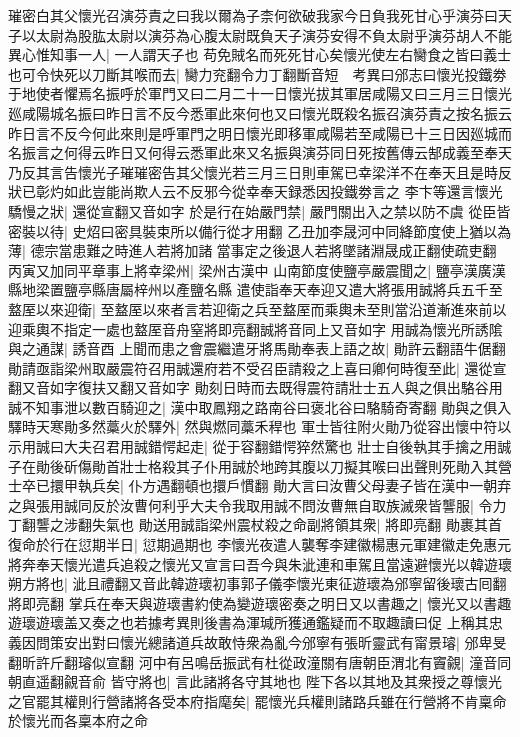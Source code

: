 璀密白其父懷光召演芬責之曰我以爾為子柰何欲破我家今日負我死甘心乎演芬曰天子以太尉為股肱太尉以演芬為心腹太尉既負天子演芬安得不負太尉乎演芬胡人不能異心惟知事一人|{
	一人謂天子也}
苟免賊名而死死甘心矣懷光使左右臠食之皆曰義士也可令快死以刀斷其喉而去|{
	臠力兖翻令力丁翻斷音短　考異曰邠志曰懷光投鐵劵于地使者懼焉名振呼於軍門又曰二月二十一日懷光拔其軍居咸陽又曰三月三日懷光廵咸陽城名振曰昨日言不反今悉軍此來何也又曰懷光既殺名振召演芬責之按名振云昨日言不反今何此來則是呼軍門之明日懷光即移軍咸陽若至咸陽已十三日因廵城而名振言之何得云昨日又何得云悉軍此來又名振與演芬同日死按舊傳云郜成義至奉天乃反其言告懷光子璀璀密告其父懷光若三月三日則車駕已幸梁洋不在奉天且是時反狀已彰灼如此豈能尚欺人云不反邪今從幸奉天録悉因投鐵劵言之}
李卞等還言懷光驕慢之狀|{
	還從宣翻又音如字}
於是行在始嚴門禁|{
	嚴門關出入之禁以防不虞}
從臣皆密裝以待|{
	史炤曰密具裝束所以備行從才用翻}
乙丑加李晟河中同絳節度使上猶以為薄|{
	德宗當患難之時進人若將加諸當事定之後退人若將墜諸淵晟成正翻使疏吏翻}
丙寅又加同平章事上將幸梁州|{
	梁州古漢中}
山南節度使鹽亭嚴震聞之|{
	鹽亭漢廣漢縣地梁置鹽亭縣唐屬梓州以產鹽名縣}
遣使詣奉天奉迎又遣大將張用誠將兵五千至盩厔以來迎衛|{
	至盩厔以來者言若迎衛之兵至盩厔而乘輿未至則當沿道漸進來前以迎乘輿不指定一處也盩厔音舟窒將即亮翻誠將音同上又音如字}
用誠為懷光所誘隂與之通謀|{
	誘音酉}
上聞而患之會震繼遣牙將馬勛奉表上語之故|{
	勛許云翻語牛倨翻}
勛請亟詣梁州取嚴震符召用誠還府若不受召臣請殺之上喜曰卿何時復至此|{
	還從宣翻又音如字復扶又翻又音如字}
勛刻日時而去既得震符請壯士五人與之俱出駱谷用誠不知事泄以數百騎迎之|{
	漢中取鳳翔之路南谷曰褒北谷曰駱騎奇寄翻}
勛與之俱入驛時天寒勛多然藁火於驛外|{
	然與燃同藁禾稈也}
軍士皆往附火勛乃從容出懷中符以示用誠曰大夫召君用誠錯愕起走|{
	從于容翻錯愕猝然驚也}
壯士自後執其手擒之用誠子在勛後斫傷勛首壯士格殺其子仆用誠於地跨其腹以刀擬其喉曰出聲則死勛入其營士卒已擐甲執兵矣|{
	仆方遇翻頓也擐戶慣翻}
勛大言曰汝曹父母妻子皆在漢中一朝弃之與張用誠同反於汝曹何利乎大夫令我取用誠不問汝曹無自取族滅衆皆讋服|{
	令力丁翻讋之涉翻失氣也}
勛送用誠詣梁州震杖殺之命副將領其衆|{
	將即亮翻}
勛裹其首復命於行在愆期半日|{
	愆期過期也}
李懷光夜遣人襲奪李建徽楊惠元軍建徽走免惠元將奔奉天懷光遣兵追殺之懷光又宣言曰吾今與朱泚連和車駕且當遠避懷光以韓遊瓌朔方將也|{
	泚且禮翻又音此韓遊瓌初事郭子儀李懷光東征遊瓌為邠寧留後瓌古囘翻將即亮翻}
掌兵在奉天與遊瓌書約使為變遊瓌密奏之明日又以書趣之|{
	懷光又以書趣遊瓌遊瓌盖又奏之也若據考異則後書為渾瑊所獲通鑑疑而不取趣讀曰促}
上稱其忠義因問策安出對曰懷光總諸道兵故敢恃衆為亂今邠寧有張昕靈武有甯景璿|{
	邠卑旻翻昕許斤翻璿似宣翻}
河中有呂鳴岳振武有杜從政潼關有唐朝臣渭北有竇覦|{
	潼音同朝直遥翻覦音俞}
皆守將也|{
	言此諸將各守其地也}
陛下各以其地及其衆授之尊懷光之官罷其權則行營諸將各受本府指麾矣|{
	罷懷光兵權則諸路兵雖在行營將不肯稟命於懷光而各稟本府之命}
